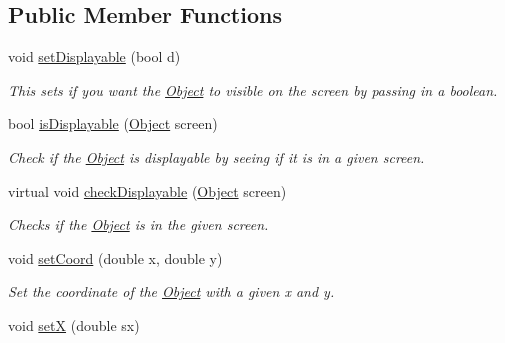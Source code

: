 \subsection*{Public Member Functions}
\begin{DoxyCompactItemize}
\item 
void \hyperlink{classObject_a6eb461900d28eba30ba6dbdb02284900}{set\+Displayable} (bool d)\hypertarget{classObject_a6eb461900d28eba30ba6dbdb02284900}{}\label{classObject_a6eb461900d28eba30ba6dbdb02284900}

\begin{DoxyCompactList}\small\item\em This sets if you want the \hyperlink{classObject}{Object} to visible on the screen by passing in a boolean. \end{DoxyCompactList}\item 
bool \hyperlink{classObject_a382084d25dd4e5c98d441c91e0ae6ec2}{is\+Displayable} (\hyperlink{classObject}{Object} screen)\hypertarget{classObject_a382084d25dd4e5c98d441c91e0ae6ec2}{}\label{classObject_a382084d25dd4e5c98d441c91e0ae6ec2}

\begin{DoxyCompactList}\small\item\em Check if the \hyperlink{classObject}{Object} is displayable by seeing if it is in a given screen. \end{DoxyCompactList}\item 
virtual void \hyperlink{classObject_afae907cba88dfbfcfd7b730349d7cb60}{check\+Displayable} (\hyperlink{classObject}{Object} screen)\hypertarget{classObject_afae907cba88dfbfcfd7b730349d7cb60}{}\label{classObject_afae907cba88dfbfcfd7b730349d7cb60}

\begin{DoxyCompactList}\small\item\em Checks if the \hyperlink{classObject}{Object} is in the given screen. \end{DoxyCompactList}\item 
void \hyperlink{classObject_a2095a5a402443ff9602f699dc76c2762}{set\+Coord} (double x, double y)\hypertarget{classObject_a2095a5a402443ff9602f699dc76c2762}{}\label{classObject_a2095a5a402443ff9602f699dc76c2762}

\begin{DoxyCompactList}\small\item\em Set the coordinate of the \hyperlink{classObject}{Object} with a given x and y. \end{DoxyCompactList}\item 
void \hyperlink{classObject_a3a3e2b361faf2deb8663ecda9c6c4868}{setX} (double sx)\hypertarget{classObject_a3a3e2b361faf2deb8663ecda9c6c4868}{}\label{classObject_a3a3e2b361faf2deb8663ecda9c6c4868}


\end{DoxyCompactItemize}
